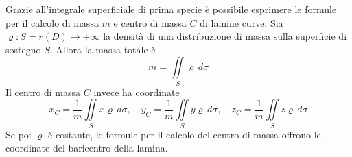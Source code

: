  \begin{oss}
     Grazie all'integrale superficiale di prima specie è possibile esprimere le formule per il calcolo di massa $m$ e centro di massa $C$ di lamine curve. Sia $\varrho: S=r(D) \to +\infty$ la densità di una distribuzione di massa sulla superficie di sostegno $S$. Allora la massa totale è
     \begin{equation}
         m= \iint\limits_S{\varrho}\, d\sigma
     \end{equation}
     Il centro di massa $C$ invece ha coordinate
     \begin{equation}
         x_C= \frac{1}{m}\iint\limits_{S}{x \varrho}\, d\sigma, \quad y_C= \frac{1}{m}\iint\limits_{S}{y \varrho}\, d\sigma, \quad z_C= \frac{1}{m}\iint\limits_{S}{z \varrho}\, d\sigma
     \end{equation}
     Se poi $\varrho$ è costante, le formule per il calcolo del centro di massa offrono le coordinate del baricentro della lamina. 
 \end{oss}
